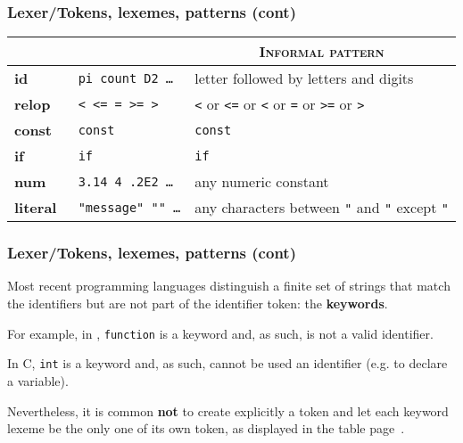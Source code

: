 % 
\begin{frame}
\frametitle{Lexer/Tokens, lexemes, patterns (cont)}

\label{tokens_lexemes}

{\small
\begin{center}
\begin{tabular}{>{\bfseries\sffamily}l|>{\tt}l|l}
\hline\hline
  \multicolumn{1}{c|}{\textsc{Token}}
& \multicolumn{1}{c|}{\textsc{Sample lexemes}} 
& \multicolumn{1}{c}{\textsc{Informal pattern}}\\
\hline
id       & pi count D2 \dots  & letter followed by letters and digits\\
relop    & < <= = >= >   & \texttt{<} or \texttt{<=} or \texttt{<} or \texttt{=} or \texttt{>=} or \texttt{>}\\
const    & const         & \texttt{const}\\
if       & if            & \texttt{if}\\
num      & 3.14 4 .2E2 \ldots  & any numeric constant\\
literal  & "message" ""  \ldots & any characters between \texttt{"} and \texttt{"} except \texttt{"}\\
\hline
\end{tabular}
\end{center}
}

\end{frame}

% 
\begin{frame}
\frametitle{Lexer/Tokens, lexemes, patterns (cont)}

Most recent programming languages distinguish a finite set of strings
that match the identifiers but are not part of the identifier token:
the \textbf{keywords}.

\bigskip

For example, in \Ada, \texttt{function} is a keyword and, as such, is
not a valid identifier.

\bigskip

In C, \texttt{int} is a keyword and, as such, cannot be used an
identifier (e.g. to declare a variable).

\bigskip

Nevertheless, it is common \textbf{not} to create explicitly
a  token and let each keyword lexeme be the only
one of its own token, as displayed in the table
page~\pageref{tokens_lexemes}.

\end{frame}

